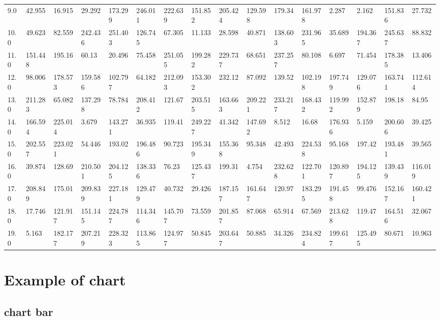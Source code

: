 \documentclass[reprint, floatfix, groupaddress, prb]{article}
\begin{document}
\begin{table}[ht]
{\begin{tabular}[l]{llllllllllllllll}
9.0 & 42.955 & 16.915 & 29.292 & 173.299 & 246.011 & 222.639 & 151.852 & 205.424 & 129.598 & 179.34 & 161.978 & 2.287 & 2.162 & 151.836 & 27.732\\ 
10.0 & 49.623 & 82.559 & 242.436 & 251.403 & 126.745 & 67.305 & 11.133 & 28.598 & 40.871 & 138.603 & 231.965 & 35.689 & 194.367 & 245.637 & 88.832\\ 
11.0 & 151.448 & 195.16 & 60.13 & 20.496 & 75.458 & 251.055 & 199.282 & 229.737 & 68.651 & 237.257 & 80.108 & 6.697 & 71.454 & 178.385 & 13.406\\ 
12.0 & 98.006 & 178.573 & 159.586 & 102.797 & 64.182 & 212.093 & 153.302 & 232.12 & 87.092 & 139.52 & 102.198 & 197.749 & 129.076 & 163.741 & 112.614\\ 
13.0 & 211.283 & 65.082 & 137.298 & 78.784 & 208.412 & 121.67 & 203.515 & 163.663 & 209.221 & 233.217 & 168.432 & 119.992 & 152.879 & 198.18 & 84.95\\ 
14.0 & 166.594 & 225.014 & 3.679 & 143.271 & 36.935 & 119.41 & 249.227 & 41.342 & 147.692 & 8.512 & 16.68 & 176.936 & 5.159 & 200.606 & 39.425\\ 
15.0 & 202.557 & 223.021 & 54.446 & 193.02 & 196.486 & 90.723 & 195.349 & 155.368 & 95.348 & 42.493 & 224.538 & 95.168 & 197.42 & 193.481 & 39.565\\ 
16.0 & 39.874 & 128.69 & 210.501 & 204.125 & 138.336 & 76.23 & 125.437 & 199.31 & 4.754 & 232.628 & 122.701 & 120.897 & 194.125 & 139.439 & 116.019\\ 
17.0 & 208.849 & 175.01 & 209.839 & 227.181 & 129.479 & 40.732 & 29.426 & 187.157 & 161.647 & 120.97 & 183.295 & 191.458 & 99.476 & 152.167 & 160.421\\ 
18.0 & 17.746 & 121.917 & 151.145 & 224.787 & 114.346 & 145.707 & 73.559 & 201.857 & 87.068 & 65.914 & 67.569 & 213.628 & 119.47 & 164.516 & 32.067\\ 
19.0 & 5.163 & 182.177 & 207.219 & 228.323 & 113.865 & 124.977 & 50.845 & 203.647 & 50.885 & 34.326 & 234.824 & 199.617 & 125.495 & 80.671 & 10.963\\ 
\bottomrule 
 \end{tabular}
}\end{table}

    

    \hypertarget{example-of-chart}{%
\section{Example of chart}\label{example-of-chart}}

    \hypertarget{chart-bar}{%
\subsection{chart bar}\label{chart-bar}}
\end{document}
